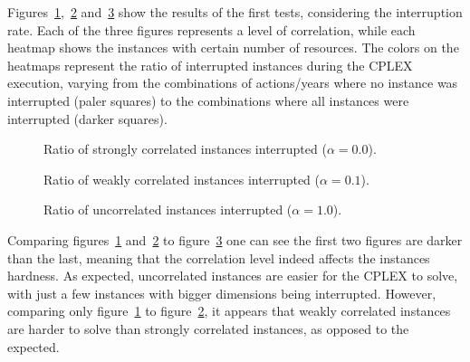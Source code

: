 Figures~\ref{fig:result00},~\ref{fig:result01} and~\ref{fig:result10} show the results of the first tests, 
considering the interruption rate. Each of the three figures represents a level of correlation, while each heatmap 
shows the instances with certain number of resources. The colors on the heatmaps represent the ratio of interrupted 
instances during the CPLEX execution, varying from the combinations of actions/years where no instance was interrupted 
(paler squares) to the combinations where all instances were interrupted (darker squares).

\begin{figure}[H]
  \centering
  \resizebox{\columnwidth}{!}{%
    \subfloat[1 resource]{}
    \subfloat[2 resources]{}
    \subfloat[4 resources]{}
  }
  \caption{Ratio of strongly correlated instances interrupted ($\alpha = 0.0$).}
  \label{fig:result00}
\end{figure}

\begin{figure}[H]
  \centering
  \resizebox{\columnwidth}{!}{%
    \subfloat[1 resource]{}
    \subfloat[2 resources]{}
    \subfloat[4 resources]{}
  }
  \caption{Ratio of weakly correlated instances interrupted ($\alpha = 0.1$).}
  \label{fig:result01}
\end{figure}

\begin{figure}[H]
  \centering
  \resizebox{\columnwidth}{!}{%
    \subfloat[1 resource]{}
    \subfloat[2 resources]{}
    \subfloat[4 resources]{}
  }
  \caption{Ratio of uncorrelated instances interrupted ($\alpha = 1.0$).}
  \label{fig:result10}
\end{figure}

Comparing figures~\ref{fig:result00} and~\ref{fig:result01} to figure~\ref{fig:result10} one can see the first two figures are darker 
than the last, meaning that the correlation level indeed affects the instances hardness. As expected, uncorrelated instances
are easier for the CPLEX to solve, with just a few instances with bigger dimensions being interrupted. However, comparing only 
figure~\ref{fig:result00} to figure~\ref{fig:result01}, it appears that weakly correlated instances are harder to solve than
strongly correlated instances, as opposed to the expected.

